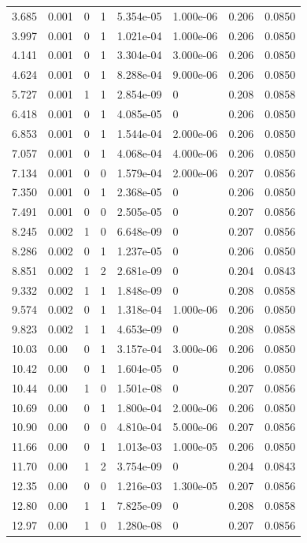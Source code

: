 \documentclass[preview]{standalone}
\begin{document}
{{\begin{tabular}{L{1.2cm}C{1.2cm} C{0.3cm}C{0.5cm} C{1.4cm}C{1.4cm} C{1.4cm}C{1.4cm}}
  3.685  &  0.001  & 0     &  1 &  5.354e-05  & 1.000e-06  & 0.206 &  0.0850   \\ 
  3.997  &  0.001  & 0     &  1 &  1.021e-04  & 1.000e-06  & 0.206 &  0.0850   \\ 
  4.141  &  0.001  & 0     &  1 &  3.304e-04  & 3.000e-06  & 0.206 &  0.0850   \\ 
  4.624  &  0.001  & 0     &  1 &  8.288e-04  & 9.000e-06  & 0.206 &  0.0850   \\ 
  5.727  &  0.001  & 1     &  1 &  2.854e-09  & 0  & 0.208 &  0.0858   \\ 
  6.418  &  0.001  & 0     &  1 &  4.085e-05  & 0  & 0.206 &  0.0850   \\ 
  6.853  &  0.001  & 0     &  1 &  1.544e-04  & 2.000e-06  & 0.206 &  0.0850   \\ 
  7.057  &  0.001  & 0     &  1 &  4.068e-04  & 4.000e-06  & 0.206 &  0.0850   \\ 
  7.134  &  0.001  & 0     &  0 &  1.579e-04  & 2.000e-06  & 0.207 &  0.0856   \\ 
  7.350  &  0.001  & 0     &  1 &  2.368e-05  & 0  & 0.206 &  0.0850   \\ 
  7.491  &  0.001  & 0     &  0 &  2.505e-05  & 0  & 0.207 &  0.0856   \\ 
  8.245  &  0.002  & 1     &  0 &  6.648e-09  & 0  & 0.207 &  0.0856   \\ 
  8.286  &  0.002  & 0     &  1 &  1.237e-05  & 0  & 0.206 &  0.0850   \\ 
  8.851  &  0.002  & 1     &  2 &  2.681e-09  & 0  & 0.204 &  0.0843   \\ 
  9.332  &  0.002  & 1     &  1 &  1.848e-09  & 0  & 0.208 &  0.0858   \\ 
  9.574  &  0.002  & 0     &  1 &  1.318e-04  & 1.000e-06  & 0.206 &  0.0850   \\ 
  9.823  &  0.002  & 1     &  1 &  4.653e-09  & 0  & 0.208 &  0.0858   \\ 
  10.03  &  0.00  & 0     &  1 &  3.157e-04  & 3.000e-06  & 0.206 &  0.0850   \\ 
  10.42  &  0.00  & 0     &  1 &  1.604e-05  & 0  & 0.206 &  0.0850   \\ 
  10.44  &  0.00  & 1     &  0 &  1.501e-08  & 0  & 0.207 &  0.0856   \\ 
  10.69  &  0.00  & 0     &  1 &  1.800e-04  & 2.000e-06  & 0.206 &  0.0850   \\ 
  10.90  &  0.00  & 0     &  0 &  4.810e-04  & 5.000e-06  & 0.207 &  0.0856   \\ 
  11.66  &  0.00  & 0     &  1 &  1.013e-03  & 1.000e-05  & 0.206 &  0.0850   \\ 
  11.70  &  0.00  & 1     &  2 &  3.754e-09  & 0  & 0.204 &  0.0843   \\ 
  12.35  &  0.00  & 0     &  0 &  1.216e-03  & 1.300e-05  & 0.207 &  0.0856   \\ 
  12.80  &  0.00  & 1     &  1 &  7.825e-09  & 0  & 0.208 &  0.0858   \\ 
  12.97  &  0.00  & 1     &  0 &  1.280e-08  & 0  & 0.207 &  0.0856   \\ 
\hline 
\end{tabular} 

}}
\end{document}
